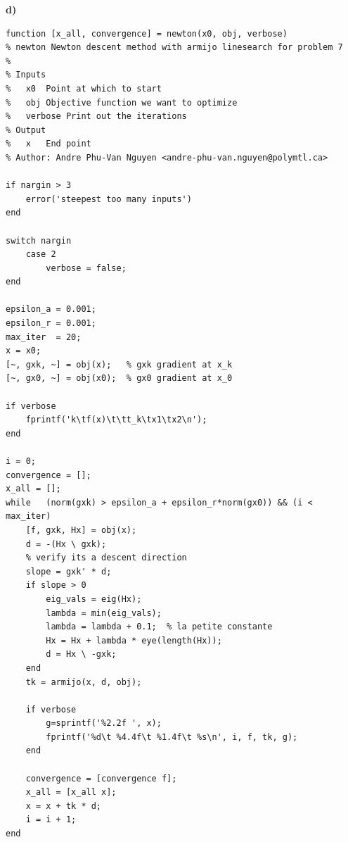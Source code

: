 \textbf{d)}
\begin{lstlisting}[style=Matlab-editor]
function [x_all, convergence] = newton(x0, obj, verbose)
% newton Newton descent method with armijo linesearch for problem 7
%   
% Inputs
%   x0  Point at which to start
%   obj Objective function we want to optimize
%   verbose Print out the iterations
% Output 
%   x   End point
% Author: Andre Phu-Van Nguyen <andre-phu-van.nguyen@polymtl.ca>

if nargin > 3
    error('steepest too many inputs')
end

switch nargin
    case 2
        verbose = false;
end

epsilon_a = 0.001;
epsilon_r = 0.001;
max_iter  = 20;
x = x0;
[~, gxk, ~] = obj(x);   % gxk gradient at x_k
[~, gx0, ~] = obj(x0);  % gx0 gradient at x_0

if verbose
    fprintf('k\tf(x)\t\tt_k\tx1\tx2\n');
end

i = 0;
convergence = [];
x_all = [];
while   (norm(gxk) > epsilon_a + epsilon_r*norm(gx0)) && (i < max_iter)
    [f, gxk, Hx] = obj(x);
    d = -(Hx \ gxk);
    % verify its a descent direction
    slope = gxk' * d;
    if slope > 0
        eig_vals = eig(Hx);
        lambda = min(eig_vals);
        lambda = lambda + 0.1;  % la petite constante
        Hx = Hx + lambda * eye(length(Hx));
        d = Hx \ -gxk;
    end
    tk = armijo(x, d, obj);
    
    if verbose
        g=sprintf('%2.2f ', x);
        fprintf('%d\t %4.4f\t %1.4f\t %s\n', i, f, tk, g);
    end
    
    convergence = [convergence f];
    x_all = [x_all x];
    x = x + tk * d;
    i = i + 1;
end
\end{lstlisting}

